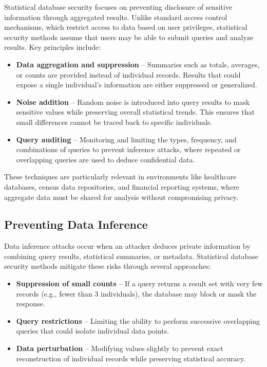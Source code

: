\documentclass[12pt,a4paper]{article}
\begin{document}
Statistical database security focuses on preventing disclosure of sensitive information through aggregated results. Unlike standard access control mechanisms, which restrict access to data based on user privileges, statistical security methods assume that users may be able to submit queries and analyze results. Key principles include:

\begin{itemize}
  \item \textbf{Data aggregation and suppression} -- Summaries such as totals, averages, or counts are provided instead of individual records. Results that could expose a single individual's information are either suppressed or generalized.
  \item \textbf{Noise addition} -- Random noise is introduced into query results to mask sensitive values while preserving overall statistical trends. This ensures that small differences cannot be traced back to specific individuals.
  \item \textbf{Query auditing} -- Monitoring and limiting the types, frequency, and combinations of queries to prevent inference attacks, where repeated or overlapping queries are used to deduce confidential data.
\end{itemize}

These techniques are particularly relevant in environments like healthcare databases, census data repositories, and financial reporting systems, where aggregate data must be shared for analysis without compromising privacy.

\subsection{Preventing Data Inference}

Data inference attacks occur when an attacker deduces private information by combining query results, statistical summaries, or metadata. Statistical database security methods mitigate these risks through several approaches:

\begin{itemize}
  \item \textbf{Suppression of small counts} -- If a query returns a result set with very few records (e.g., fewer than 3 individuals), the database may block or mask the response.
  \item \textbf{Query restrictions} -- Limiting the ability to perform successive overlapping queries that could isolate individual data points.
  \item \textbf{Data perturbation} -- Modifying values slightly to prevent exact reconstruction of individual records while preserving statistical accuracy.
\end{itemize}
\end{document}
